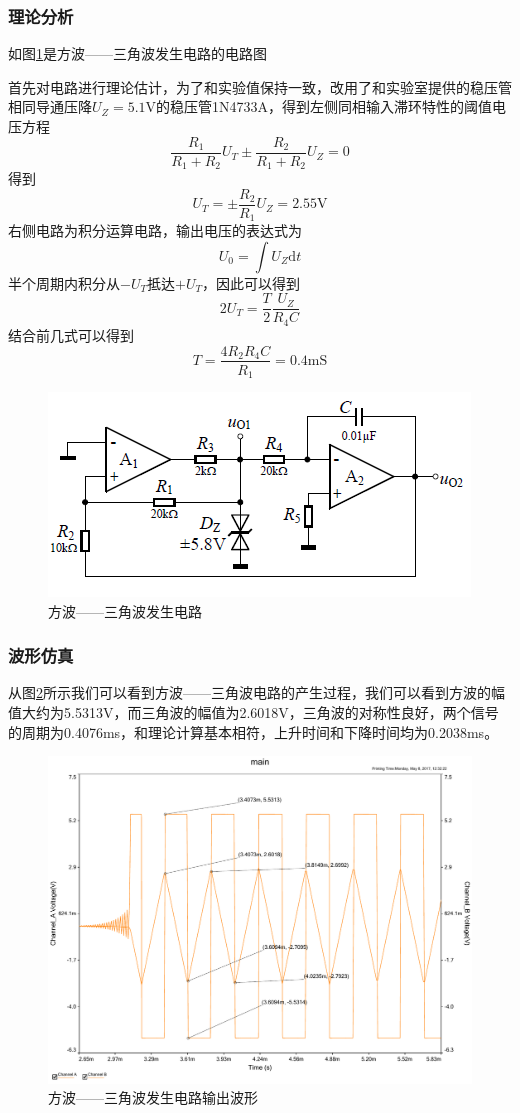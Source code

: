 \documentclass[UTF8,a4paper]{paper}
\begin{document}
\subsubsection{理论分析}
\label{sec:}
\begin{multicols}{2}
如图\ref{BICirc}是方波——三角波发生电路的电路图

首先对电路进行理论估计，为了和实验值保持一致，改用了和实验室提供的稳压管相同导通压降$U_Z=5.1\mathrm{V}$的稳压管1N4733A，得到左侧同相输入滞环特性的阈值电压方程
$$\frac{R_1}{R_1+R_2}U_T\pm\frac{R_2}{R_1+R_2}U_Z=0$$
得到
$$U_T=\pm\frac{R_2}{R_1}U_Z=2.55\mathrm{V}$$
右侧电路为积分运算电路，输出电压的表达式为
$$U_0=\int U_Z\mathrm{d}t$$半个周期内积分从$-U_T$抵达$+U_T$，因此可以得到$$2U_T=\frac{T}{2}\frac{U_Z}{R_4C}$$结合前几式可以得到$$T=\frac{4R_2R_4C}{R_1}=0.4\mathrm{mS}$$
\begin {figure}[H]
\includegraphics [width=\columnwidth]{bi.png}
\caption{方波——三角波发生电路}
\label{BICirc}
\end {figure}
\end{multicols}
\subsubsection{波形仿真}
从图\ref{BI}所示我们可以看到方波——三角波电路的产生过程，我们可以看到方波的幅值大约为5.5313V，而三角波的幅值为2.6018V，三角波的对称性良好，两个信号的周期为0.4076ms，和理论计算基本相符，上升时间和下降时间均为0.2038ms。
\begin{figure}
\centering
\includegraphics[width=\textwidth]{bi.pdf}
\caption{方波——三角波发生电路输出波形}
\label{BI}
\end{figure}
\end{document}
